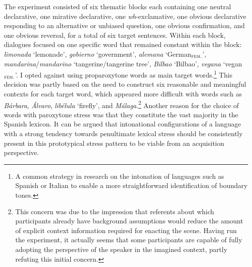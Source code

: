 The experiment consisted of six thematic blocks each containing one neutral declarative, one mirative declarative, one \textit{wh}-exclamative, one obvious declarative responding to an alternative or unbiased question, one obvious confirmation, and one obvious reversal, for a total of six target sentences. Within each block, dialogues focused on one specific word that remained constant within the block: \textit{limonada} `lemonade', \textit{gobierno} `government', \textit{alemana} `German$_{\textsc{fem.}}$', \textit{mandarina}/\textit{mandarino} `tangerine/tangerine tree', \textit{Bilbao} `Bilbao', \textit{vegana} `ve\-gan$_\textsc{fem.}$'. I opted against using proparoxytone words as main target words.\footnote{A common strategy in research on the intonation of languages such as Spanish \citep{GabrielFeldhausenPeskova2011} or Italian \citep{GiliFivelaETAL2015intonationalvariation} to enable a more straightforward identification of boundary tones.} This decision was partly based on the need to construct six reasonable and meaningful contexts for each target word, which appeared more difficult with words such as \textit{Bárbara}, \textit{Álvaro}, \textit{libélula} `firefly', and \textit{Málaga}.\footnote{This concern was due to the impression that referents about which participants already have background assumptions would reduce the amount of explicit context information required for enacting the scene. Having run the experiment, it actually seems that some participants are capable of fully adopting the perspective of the speaker in the imagined context, partly refuting this initial concern.} Another reason for the choice of words with paroxytone stress was that they constitute the vast majority in the Spanish lexicon. It can be argued that intonational configurations of a language with a strong tendency towards penultimate lexical stress should be consistently present in this prototypical stress pattern to be viable from an acquisition perspective.

